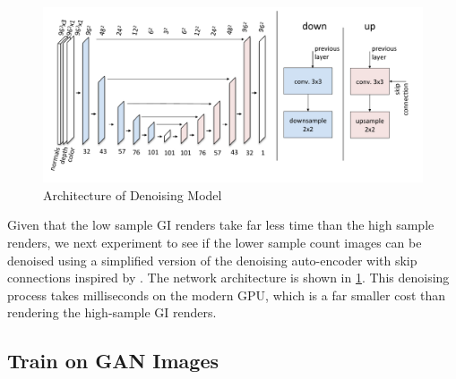 \documentclass[10pt,twocolumn,letterpaper]{article}
\begin{document}
\begin{figure}[h!]
\centering
\includegraphics[width=1.0\columnwidth]{./assets/denoiser_diagram.pdf}
\caption{Architecture of Denoising Model}
\label{fig:denoise}
\end{figure}
Given that the low sample GI renders take far less time than the high sample renders, we next experiment to see if the lower sample count images can be denoised using a simplified version of the denoising auto-encoder with skip connections inspired by \cite{Chaitanya:2017:IRM:3072959.3073601}. %
The network architecture is shown in \ref{fig:denoise}. %
This denoising process takes milliseconds on the modern GPU, which is a far smaller cost than rendering the high-sample GI renders.


\subsection{Train on GAN Images}
\end{document}
